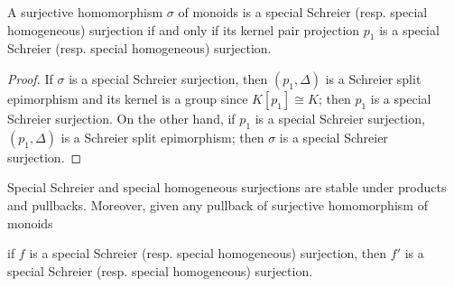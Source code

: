 \begin{corollary}
\label{cor:SpecialIFFSpecial}
    A surjective homomorphism $\sigma$ of monoids is a special Schreier (resp. special homogeneous) surjection if and only if its kernel pair projection $p_1$ is a special Schreier (resp. special homogeneous) surjection.
    \begin{proof}
        If $\sigma$ is a special Schreier surjection, then $(p_1,\Delta)$ is a Schreier split epimorphism and its kernel is a group since $K[p_1]\cong K$; then $p_1$ is a special Schreier surjection. On the other hand, if $p_1$ is a special Schreier surjection, $(p_1,\Delta)$ is a Schreier split epimorphism; then $\sigma$ is a special Schreier surjection.
    \end{proof}
\end{corollary}
\begin{proposition}
\label{prop:PullbackSpecialHomo}
    Special Schreier and special homogeneous surjections are stable under products and pullbacks. Moreover, given any pullback of surjective homomorphism of monoids
    \begin{center}
    \end{center}
    if $f$ is a special Schreier (resp. special homogeneous) surjection, then $f'$ is a special Schreier (resp. special homogeneous) surjection.
\end{proposition}

